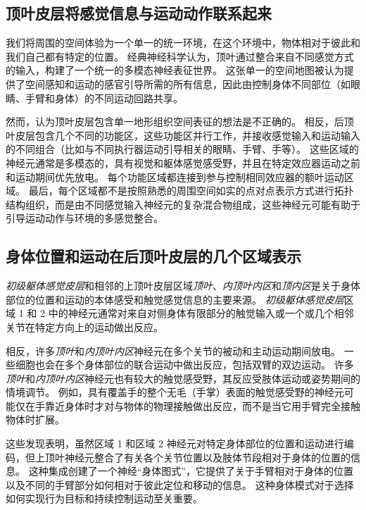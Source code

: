 \subsection{顶叶皮层将感觉信息与运动动作联系起来}

我们将周围的空间体验为一个单一的统一环境，在这个环境中，物体相对于彼此和我们自己都有特定的位置。
经典神经科学认为，顶叶通过整合来自不同感觉方式的输入，构建了一个统一的多模态神经表征世界。
这张单一的空间地图被认为提供了空间感知和运动的感官引导所需的所有信息，因此由控制身体不同部位（如眼睛、手臂和身体）的不同运动回路共享。


然而，认为顶叶皮层包含单一地形组织空间表征的想法是不正确的。
相反，后顶叶皮层包含几个不同的功能区，这些功能区并行工作，并接收感觉输入和运动输入的不同组合（比如与不同执行器运动引导相关的眼睛、手臂、手等）。
这些区域的神经元通常是多模态的，具有视觉和躯体感觉感受野，并且在特定效应器运动之前和运动期间优先放电。
每个功能区域都连接到参与控制相同效应器的额叶运动区域。
最后，每个区域都不是按照熟悉的周围空间如实的点对点表示方式进行拓扑结构组织，而是由不同感觉输入神经元的复杂混合物组成，这些神经元可能有助于引导运动动作与环境的多感觉整合。



\subsection{身体位置和运动在后顶叶皮层的几个区域表示}

\textit{初级躯体感觉皮层}和相邻的上顶叶皮层区域\textit{顶叶}、\textit{内顶叶内区}和\textit{顶内区}是关于身体部位的位置和运动的本体感受和触觉感觉信息的主要来源。
\textit{初级躯体感觉皮层}区域 1 和 2 中的神经元通常对来自对侧身体有限部分的触觉输入或一个或几个相邻关节在特定方向上的运动做出反应。


相反，许多\textit{顶叶}和\textit{内顶叶内区}神经元在多个关节的被动和主动运动期间放电。
一些细胞也会在多个身体部位的联合运动中做出反应，包括双臂的双边运动。
许多\textit{顶叶}和\textit{内顶叶内区}神经元也有较大的触觉感受野，其反应受肢体运动或姿势期间的情境调节。
例如，具有覆盖手的整个无毛（手掌）表面的触觉感受野的神经元可能仅在手靠近身体时才对与物体的物理接触做出反应，而不是当它用手臂完全接触物体时扩展。


这些发现表明，虽然区域 1 和区域 2 神经元对特定身体部位的位置和运动进行编码，但上顶叶神经元整合了有关各个关节位置以及肢体节段相对于身体的位置的信息。
这种集成创建了一个神经“身体图式”，它提供了关于手臂相对于身体的位置以及不同的手臂部分如何相对于彼此定位和移动的信息。
这种身体模式对于选择如何实现行为目标和持续控制运动至关重要。


